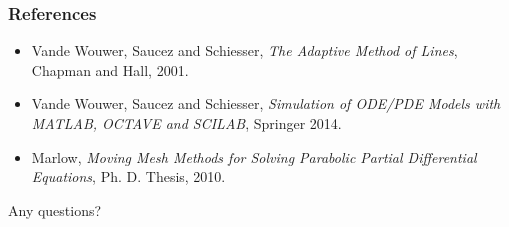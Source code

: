 \documentclass[compress,blue]{beamer}
\begin{document}
\begin{frame}%
        \frametitle{References}
	\small
        \begin{itemize}
        		\item Vande Wouwer, Saucez and Schiesser, \emph{The Adaptive Method of Lines}, Chapman and Hall, 2001.
		\item Vande Wouwer, Saucez and Schiesser, \emph{Simulation of ODE/PDE Models with MATLAB, OCTAVE and SCILAB}, Springer 2014.
		\item Marlow, \emph{Moving Mesh Methods for Solving Parabolic Partial Differential Equations}, Ph. D. Thesis, 2010.
	\end{itemize}
	\huge
	\centering
	Any questions?
%        
%        
\end{frame}
\end{document}
